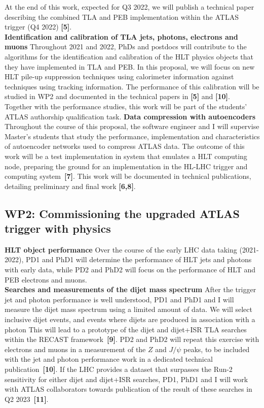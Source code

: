 At the end of this work, expected for Q3 2022, we will publish a technical paper describing the combined TLA and PEB implementation within the ATLAS trigger (Q4 2022) \textbf{[5]}. \\
\textbf{Identification and calibration of TLA jets, photons, electrons and muons} Throughout 2021 and 2022, PhDs and postdocs will contribute to the algorithms for the identification and calibration of the HLT physics objects that they have implemented in TLA and PEB. 
In this proposal, we will focus on new HLT pile-up suppression techniques using calorimeter information against techniques using tracking information. 
The performance of this calibration will be studied in WP2 and documented in the technical papers in \textbf{[5]} and \textbf{[10]}.\\
Together with the performance studies, this work will be part of the students' ATLAS authorship qualification task.
\textbf{Data compression with autoencoders} Throughout the course of this proposal, the software engineer and I will supervise Master's students that study the performance, implementation and characteristics of autoencoder networks used to compress ATLAS data. 
The outcome of this work will be a test implementation in system that emulates a HLT computing node, preparing the ground for an implementation in the HL-LHC trigger and computing system~\textbf{[7]}. 
This work will be documented in technical publications, detailing preliminary and final work \textbf{[6,8]}.

\subsection{WP2: Commissioning the upgraded ATLAS trigger with physics}

\textbf{HLT object performance} Over the course of the early LHC data taking (2021-2022), 
PD1 and PhD1 will determine the performance of HLT jets and photons with early data, while PD2 and PhD2 will focus on the performance of HLT and PEB electrons and muons. \\
\textbf{Searches and measurements of the dijet mass spectrum} After the trigger jet and photon performance is well understood, PD1 and PhD1 and I will measure the dijet mass spectrum using a limited amount of data. 
We will select inclusive dijet events, and events where dijets are produced in association with a photon
This will lead to a prototype of the dijet and dijet+ISR TLA searches within the RECAST framework~\textbf{[9]}.   
PD2 and PhD2 will repeat this exercise with electrons and muons in a measurement of the $Z$ and $J/\psi$ peaks, 
to be included with the jet and photon performance work in a dedicated technical publication~\textbf{[10]}. 
If the LHC provides a dataset that surpasses the Run-2 sensitivity for either dijet and dijet+ISR searches, 
PD1, PhD1 and I will work with ATLAS collaborators towards publication of the result of these searches in Q2 2023~\textbf{[11]}.

